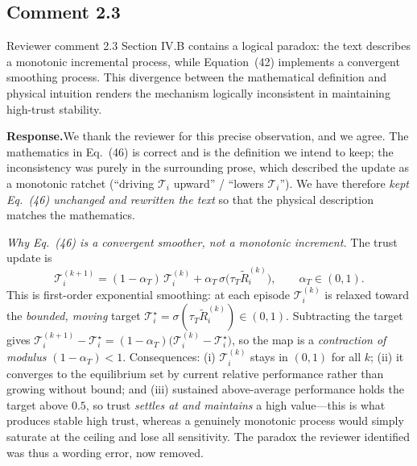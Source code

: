 \documentclass[11pt]{article}
\newcommand{\rsp}{\medskip\noindent\textbf{Response.}\quad}
\begin{document}



\subsection*{Comment 2.3}

\begin{reviewercomment}{Reviewer comment 2.3}
Section IV.B contains a logical paradox: the text describes a monotonic incremental
process, while Equation~(42) implements a convergent smoothing process. This
divergence between the mathematical definition and physical intuition renders the
mechanism logically inconsistent in maintaining high-trust stability.
\end{reviewercomment}

\rsp We thank the reviewer for this precise observation, and we agree. The
mathematics in Eq.~(46) is correct and is the definition we intend to keep; the
inconsistency was purely in the surrounding prose, which described the update as a
monotonic ratchet (``driving $\mathcal{T}_i$ upward'' / ``lowers $\mathcal{T}_i$'').
We have therefore \emph{kept Eq.~(46) unchanged and rewritten the text} so that the
physical description matches the mathematics.

\medskip
\noindent\emph{Why Eq.~(46) is a convergent smoother, not a monotonic increment.}\quad
The trust update is
\[
  \mathcal{T}_i^{(k+1)} = (1-\alpha_T)\,\mathcal{T}_i^{(k)}
        + \alpha_T\,\sigma\!\bigl(\tau_T \tilde{R}_i^{(k)}\bigr),
        \qquad \alpha_T\in(0,1).
\]
This is first-order exponential smoothing: at each episode $\mathcal{T}_i^{(k)}$ is
relaxed toward the \emph{bounded, moving} target
$\mathcal{T}_i^{\star}=\sigma(\tau_T\tilde{R}_i^{(k)})\in(0,1)$. Subtracting the
target gives
$\mathcal{T}_i^{(k+1)}-\mathcal{T}_i^{\star}
 =(1-\alpha_T)\bigl(\mathcal{T}_i^{(k)}-\mathcal{T}_i^{\star}\bigr)$,
so the map is a \emph{contraction of modulus $(1-\alpha_T)<1$}. Consequences: (i)
$\mathcal{T}_i^{(k)}$ stays in $(0,1)$ for all $k$; (ii) it converges to the
equilibrium set by current relative performance rather than growing without bound;
and (iii) sustained above-average performance holds the target above $0.5$, so trust
\emph{settles at and maintains} a high value---this is what produces stable
high trust, whereas a genuinely monotonic process would simply saturate at the
ceiling and lose all sensitivity. The paradox the reviewer identified was thus a
wording error, now removed.
\end{document}
